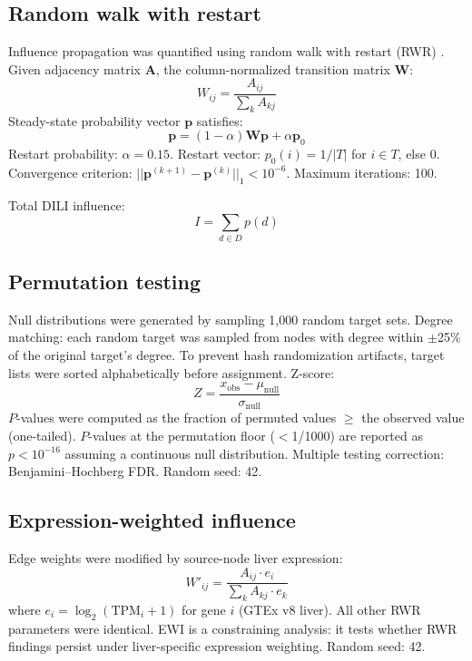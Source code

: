 \subsection{Random walk with restart}

Influence propagation was quantified using random walk with restart (RWR) \citep{Kohler2008, Guney2016}.
Given adjacency matrix $\mathbf{A}$, the column-normalized transition matrix $\mathbf{W}$:
\begin{equation}
    W_{ij} = \frac{A_{ij}}{\sum_k A_{kj}}
\end{equation}
Steady-state probability vector $\mathbf{p}$ satisfies:
\begin{equation}
    \mathbf{p} = (1 - \alpha) \mathbf{W} \mathbf{p} + \alpha \mathbf{p}_0
\end{equation}
Restart probability: $\alpha = 0.15$.
Restart vector: $p_0(i) = 1/|T|$ for $i \in T$, else 0.
Convergence criterion: $||\mathbf{p}^{(k+1)} - \mathbf{p}^{(k)}||_1 < 10^{-6}$.
Maximum iterations: 100.

Total DILI influence:
\begin{equation}
    I = \sum_{d \in D} p(d)
\end{equation}

\subsection{Permutation testing}

Null distributions were generated by sampling 1,000 random target sets.
Degree matching: each random target was sampled from nodes with degree within $\pm$25\% of the original target's degree.
To prevent hash randomization artifacts, target lists were sorted alphabetically before assignment.
Z-score:
\begin{equation}
    Z = \frac{x_{\text{obs}} - \mu_{\text{null}}}{\sigma_{\text{null}}}
\end{equation}
$P$-values were computed as the fraction of permuted values $\geq$ the observed value (one-tailed).
$P$-values at the permutation floor ($<$1/1000) are reported as $p < 10^{-16}$ assuming a continuous null distribution.
Multiple testing correction: Benjamini--Hochberg FDR.
Random seed: 42.

\subsection{Expression-weighted influence}

Edge weights were modified by source-node liver expression:
\begin{equation}
    W'_{ij} = \frac{A_{ij} \cdot e_i}{\sum_k A_{kj} \cdot e_k}
\end{equation}
where $e_i = \log_2(\text{TPM}_i + 1)$ for gene $i$ (GTEx v8 liver).
All other RWR parameters were identical.
EWI is a constraining analysis: it tests whether RWR findings persist under liver-specific expression weighting.
Random seed: 42.

